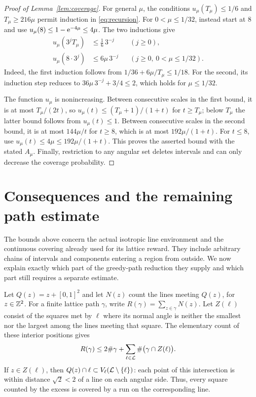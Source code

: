 \documentclass[11pt,letterpaper]{article}
\begin{document}
\begin{proof}[Proof of Lemma~\ref{lem:coverage}]
For general $\mu$, the conditions $u_\mu(T_\mu)\le1/6$ and $T_\mu\ge216\mu$ permit induction in \eqref{eq:recursion}. For $0<\mu\le1/32$, instead start at $8$ and use $u_\mu(8)\le1-\mathrm{e}^{-4\mu}\le4\mu$. The two inductions give
\begin{equation}\label{eq:induction}
\begin{aligned}
 u_\mu(3^jT_\mu)&\le\tfrac16\,3^{-j}
       &&(j\ge0),\\
 u_\mu(8\cdot3^j)&\le6\mu\,3^{-j}
       &&(j\ge0,\ 0<\mu\le1/32).
\end{aligned}
\end{equation}
Indeed, the first induction follows from $1/36+6\mu/T_\mu\le1/18$. For the second, its induction step reduces to $36\mu\,3^{-j}+3/4\le2$, which holds for $\mu\le1/32$.

The function $u_\mu$ is nonincreasing. Between consecutive scales in the first bound, it is at most $T_\mu/(2t)$, so $u_\mu(t)\le(T_\mu+1)/(1+t)$ for $t\ge T_\mu$; below $T_\mu$ the latter bound follows from $u_\mu(t)\le1$. Between consecutive scales in the second bound, it is at most $144\mu/t$ for $t\ge8$, which is at most $192\mu/(1+t)$. For $t\le8$, use $u_\mu(t)\le4\mu\le192\mu/(1+t)$. This proves the asserted bound with the stated $A_\mu$. Finally, restriction to any angular set deletes intervals and can only decrease the coverage probability.
\end{proof}

\section{Consequences and the remaining path estimate}

The bounds above concern the actual isotropic line environment and the continuous covering already used for its lattice reward. They include arbitrary chains of intervals and components entering a region from outside. We now explain exactly which part of the greedy-path reduction they supply and which part still requires a separate estimate.

Let $Q(z)=z+[0,1]^2$ and let $N(z)$ count the lines meeting $Q(z)$, for $z\in\mathbb Z^2$. For a finite lattice path $\gamma$, write $R(\gamma)=\sum_{z\in\gamma}N(z)$. Let $Z(\ell)$ consist of the squares met by $\ell$ where its normal angle is neither the smallest nor the largest among the lines meeting that square. The elementary count of these interior positions gives
\[
 R(\gamma)\le2\#\gamma+
             \sum_{\ell\in\mathcal L}\#\big(\gamma\cap Z(\ell)\big).
\]
If $z\in Z(\ell)$, then $Q(z)\cap\ell\subset V_\ell(\mathcal L\setminus\{\ell\})$: each point of this intersection is within distance $\sqrt2<2$ of a line on each angular side. Thus, every square counted by the excess is covered by a run on the corresponding line.
\end{document}
